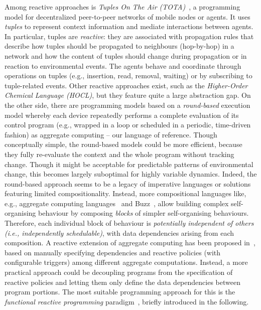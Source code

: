 Among reactive approaches is \emph{Tuples On The Air (TOTA)}~\cite{tota},
 a programming model for decentralized peer-to-peer networks of mobile nodes or agents.
%
It uses \emph{tuples} to represent context information 
 and mediate interactions between agents.
%
In particular, tuples are \emph{reactive}: they are associated with propagation rules that
describe how tuples should be propagated to neighbours (hop-by-hop) in a network and how the
content of tuples should change during propagation
 or in reaction to environmental events. 
%
The agents behave and coordinate
 through operations on tuples (e.g., insertion, read, removal, waiting) or by subscribing to tuple-related events.
%
Other reactive approaches exist, such as the \emph{Higher-Order Chemical Language (HOCL)}\cite{DBLP:journals/ijuc/BanatreFR07},
 but they feature quite a large abstraction gap.
%
On the other side, there are programming models 
 based on a \emph{round-based} execution model
 whereby 
 each device repeatedly performs a complete evaluation of its control program
 (e.g., wrapped in a loop or scheduled in a periodic, time-driven fashion) as aggregate computing -- our language of reference.
%
Though conceptually simple,
 the round-based models could be more efficient,
 because they fully re-evaluate the context
 and the whole program
 without tracking change.
%
Though it might be acceptable for predictable patterns of environmental change,
  this becomes largely suboptimal for highly variable dynamics.
%
Indeed,
the round-based approach seems to be a legacy of imperative languages or solutions featuring limited compositionality.
Instead, more compositional languages like, e.g., aggregate computing languages~\cite{aggregatecomputing,DBLP:journals/nca/BachrachBM10,DBLP:conf/ecoop/AudritoCDSV22} and Buzz~\cite{DBLP:conf/iros/PinciroliB16},
 allow building complex self-organising behaviour
 by composing \emph{blocks} of simpler self-organising behaviours.
%
Therefore, each individual block of behaviour 
  is \emph{potentially independent of others (i.e., independently schedulable)},
  with data dependencies arising from each composition.
%
A reactive extension of aggregate computing has been proposed in~\cite{DBLP:journals/lmcs/PianiniCVMZ21},
  based on manually specifying dependencies and reactive policies (with configurable triggers) among different aggregate computations.
%
Instead,
a more practical approach could be
decoupling programs from the specification of reactive policies
and letting them only define the data dependencies between program portions.
%
The most suitable programming approach for this
 is the \emph{functional reactive programming} paradigm~\cite{DBLP:journals/csur/BainomugishaCCMM13}, briefly introduced in the following.
%

